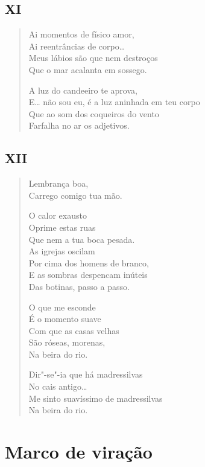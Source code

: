 \pagebreak
\section*{XI}

\begin{verse}
Ai momentos de físico amor,\\
Ai reentrâncias de corpo\ldots{}\\
Meus lábios são que nem destroços\\
Que o mar acalanta em sossego.

A luz do candeeiro te aprova,\\
E\ldots{} não sou eu, é a luz aninhada em teu corpo\\
Que ao som dos coqueiros do vento\\
Farfalha no ar os adjetivos.
\end{verse}

\pagebreak
\section*{XII}

\begin{verse}
Lembrança boa,\\
Carrego comigo tua mão.

O calor exausto\\
Oprime estas ruas\\
Que nem a tua boca pesada.\\
As igrejas oscilam\\
Por cima dos homens de branco,\\
E as sombras despencam inúteis\\
Das botinas, passo a passo.

O que me esconde\\
É o momento suave\\
Com que as casas velhas\\
São róseas, morenas,\\
Na beira do rio.

Dir"-se"-ia que há madressilvas\\
No cais antigo\ldots{}\\
Me sinto suavíssimo de madressilvas\\
Na beira do rio.
\end{verse}


\chapter[\textsc{marco de viração}\\Improviso do mal da América]{Marco de viração}

